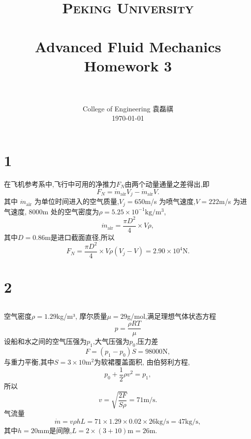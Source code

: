 \documentclass[12pt]{article}
\title{
		\vspace{-1in} 	
		\usefont{OT1}{bch}{b}{n}
		\normalfont \normalsize \textsc{\LARGE Peking University}\\[1cm] %
		\horrule{0.5pt} \\[0.5cm]
		\huge \bfseries{Advanced Fluid Mechanics Homework 3} \\
		\horrule{2pt} \\[0.5cm]
}
\author{
		\normalfont 								\normalsize
		College of Engineering \quad 2001111690  \quad 袁磊祺\\	\normalsize
        \today
}
\date{}
\begin{document}


\maketitle

\section{1}

在飞机参考系中,飞行中可用的净推力$ F_N $由两个动量通量之差得出,即
\begin{equation}
	F_{N}= \dot{m}_{\text {air}} V_{j}-\dot{m}_{\text {air}} V.
\end{equation}
其中 $\dot{m}_{\text {air}}$ 为单位时间进入的空气质量,$V_j = 650$m/s 为喷气速度,$V=222$m/s 为进气速度, 8000m 处的空气密度为$\rho = 5.25 \times 10^{-1} \mathrm{kg/m^3}$,
\begin{equation}
	\dot{m}_{\text {air}} = \frac{\pi D^2}{4} \times V \rho ,
\end{equation}
其中$D=0.86$m是进口截面直径,所以
\begin{equation}
	F_{N}= \frac{\pi D^2}{4} \times V \rho \left( V_{j}- V\right) = 2.90 \times 10^{4} \mathrm{N}.
\end{equation}

\section{2}

\subsection{}

空气密度$\rho = 1.29$kg/m³, 摩尔质量$\mu = 29 $g/mol,满足理想气体状态方程
\begin{equation}
	p = \frac{\rho R T}{\mu}
\end{equation}
设船和水之间的空气压强为$p_1$,大气压强为$p_0$,压力差
\begin{equation}
	F = (p_1-p_0)S = 98000 \mathrm{N},
\end{equation}
与重力平衡,其中$S = 3\times 10$m$^2$为软裙覆盖面积, 由伯努利方程,
\begin{equation}
	p_0 + \frac{1}{2}\rho v^2 = p_1,
\end{equation}
所以
\begin{equation}
	v = \sqrt{\frac{2F}{S\rho}} = 71 \si{\metre /\second}.
\end{equation}
气流量
\begin{equation}
	\dot{m} = v \rho h L = 71 \times 1.29 \times 0.02 \times 26 \mathrm{kg/s} = 47\mathrm{kg/s},
\end{equation}
其中$h=20\mathrm{mm}$是间隙,$L=2\times (3+10)\mathrm{m}=26\mathrm{m}$.
\end{document}
